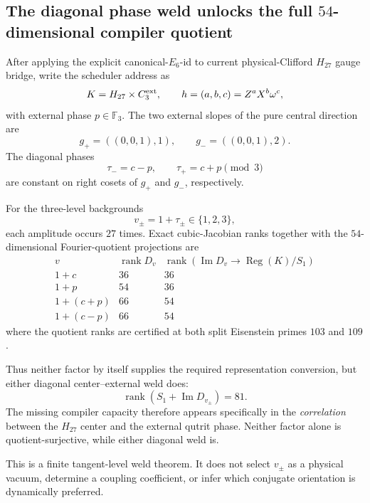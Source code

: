 \subsection*{The diagonal phase weld unlocks the full $54$-dimensional compiler quotient}

After applying the explicit canonical-$E_6$-id to current physical-Clifford $H_{27}$ gauge bridge, write the scheduler address as
\[
 K=H_{27}\times C_3^{\rm ext},
 \qquad h=(a,b,c)=Z^aX^b\omega^c,
\]
with external phase $p\in\mathbb F_3$.  The two external slopes of the pure
central direction are
\[
 g_+=((0,0,1),1),\qquad g_-=((0,0,1),2).
\]
The diagonal phases
\[
 \tau_-=c-p,\qquad \tau_+=c+p\pmod3
\]
are constant on right cosets of $g_+$ and $g_-$, respectively.

For the three-level backgrounds
\[
 v_\pm=1+\tau_\pm\in\{1,2,3\},
\]
each amplitude occurs $27$ times.  Exact cubic-Jacobian ranks together with the
$54$-dimensional Fourier-quotient projections are
\[
\begin{array}{c|c|c}
v & \operatorname{rank}D_v &
\operatorname{rank}(\operatorname{Im}D_v\to\operatorname{Reg}(K)/S_1)
\\ \hline
1+c & 36 & 36\\
1+p & 54 & 36\\
1+(c+p) & 66 & 54\\
1+(c-p) & 66 & 54
\end{array}
\]
where the quotient ranks are certified at both split Eisenstein primes
$103$ and $109$.

Thus neither factor by itself supplies the required representation conversion,
but either diagonal center--external weld does:
\[
 \operatorname{rank}(S_1+\operatorname{Im}D_{v_\pm})=81.
\]
The missing compiler capacity therefore appears specifically in the
\emph{correlation} between the $H_{27}$ center and the external qutrit phase.
Neither factor alone is quotient-surjective, while either diagonal weld is.

This is a finite tangent-level weld theorem.  It does not select $v_\pm$ as a
physical vacuum, determine a coupling coefficient, or infer which conjugate
orientation is dynamically preferred.
